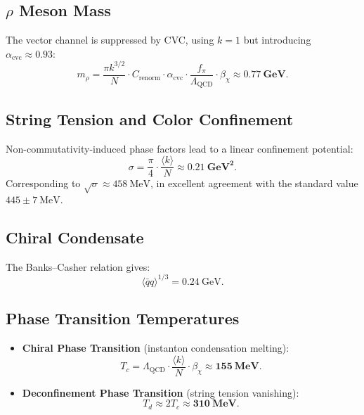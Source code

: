\documentclass[12pt,a4paper]{amsart}
\theoremstyle{plain}
\theoremstyle{definition}
\theoremstyle{remark}
\DeclareMathOperator{\QCD}{QCD}
\begin{document}
\subsection{$\rho$ Meson Mass}

The vector channel is suppressed by CVC, using $k=1$ but introducing $\alpha_{\text{cvc}} \approx 0.93$:
\begin{equation}
m_{\rho} = \frac{\pi k^{3/2}}{N} \cdot C_{\text{renorm}} \cdot \alpha_{\text{cvc}} \cdot \frac{f_\pi}{\Lambda_{\QCD}} \cdot \beta_{\chi} \approx \mathbf{0.77\ \text{GeV}}.
\end{equation}

\subsection{String Tension and Color Confinement}

Non-commutativity-induced phase factors lead to a linear confinement potential:
\begin{equation}
\sigma = \frac{\pi}{4} \cdot \frac{\langle k \rangle}{N} \approx \mathbf{0.21\ \text{GeV}^2}.
\end{equation}
Corresponding to $\sqrt{\sigma} \approx 458\ \text{MeV}$, in excellent agreement with the standard value $445\pm7\ \text{MeV}$.

\subsection{Chiral Condensate}

The Banks--Casher relation gives:
\begin{equation}
\langle\bar{q}q\rangle^{1/3} = 0.24\ \text{GeV}.
\end{equation}

\subsection{Phase Transition Temperatures}

\begin{itemize}
\item \textbf{Chiral Phase Transition} (instanton condensation melting):
\begin{equation}
T_c = \Lambda_{\QCD} \cdot \frac{\langle k \rangle}{N} \cdot \beta_{\chi} \approx \mathbf{155\ \text{MeV}}.
\end{equation}
\item \textbf{Deconfinement Phase Transition} (string tension vanishing):
\begin{equation}
T_d \approx 2T_c \approx \mathbf{310\ \text{MeV}}.
\end{equation}
\end{itemize}
\end{document}
